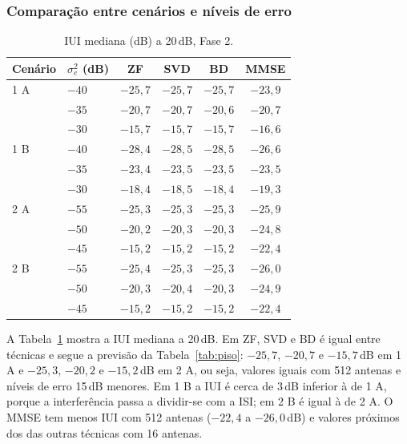 \subsubsection{Comparação entre cenários e níveis de erro}
\label{sec:comp2}
\begin{table}[H]
  \centering
  \caption{IUI mediana (dB) a 20\,dB, Fase 2.}
  \label{tab:iui}
  \footnotesize
  \begin{tabular}{@{}llcccc@{}}
    \toprule
    Cenário & $\sigma_e^2$ (dB) & ZF & SVD & BD & MMSE \\
    \midrule
    1 A & $-40$ & $-25{,}7$ & $-25{,}7$ & $-25{,}7$ & $-23{,}9$ \\
     & $-35$ & $-20{,}7$ & $-20{,}7$ & $-20{,}6$ & $-20{,}7$ \\
     & $-30$ & $-15{,}7$ & $-15{,}7$ & $-15{,}7$ & $-16{,}6$ \\
    1 B & $-40$ & $-28{,}4$ & $-28{,}5$ & $-28{,}5$ & $-26{,}6$ \\
     & $-35$ & $-23{,}4$ & $-23{,}5$ & $-23{,}5$ & $-23{,}5$ \\
     & $-30$ & $-18{,}4$ & $-18{,}5$ & $-18{,}4$ & $-19{,}3$ \\
    2 A & $-55$ & $-25{,}3$ & $-25{,}3$ & $-25{,}3$ & $-25{,}9$ \\
     & $-50$ & $-20{,}2$ & $-20{,}3$ & $-20{,}3$ & $-24{,}8$ \\
     & $-45$ & $-15{,}2$ & $-15{,}2$ & $-15{,}2$ & $-22{,}4$ \\
    2 B & $-55$ & $-25{,}4$ & $-25{,}3$ & $-25{,}3$ & $-26{,}0$ \\
     & $-50$ & $-20{,}3$ & $-20{,}4$ & $-20{,}3$ & $-24{,}9$ \\
     & $-45$ & $-15{,}2$ & $-15{,}2$ & $-15{,}2$ & $-22{,}4$ \\
    \bottomrule
  \end{tabular}
\end{table}

A Tabela~\ref{tab:iui} mostra a IUI mediana a 20\,dB. Em ZF, SVD e BD é igual entre técnicas e segue a previsão da Tabela~\ref{tab:piso}: $-25{,}7$, $-20{,}7$ e $-15{,}7$\,dB em 1 A e $-25{,}3$, $-20{,}2$ e $-15{,}2$\,dB em 2 A, ou seja, valores iguais com 512 antenas e níveis de erro 15\,dB menores. Em 1 B a IUI é cerca de 3\,dB inferior à de 1 A, porque a interferência passa a dividir-se com a ISI; em 2 B é igual à de 2 A. O MMSE tem menos IUI com 512 antenas ($-22{,}4$ a $-26{,}0$\,dB) e valores próximos dos das outras técnicas com 16 antenas.

